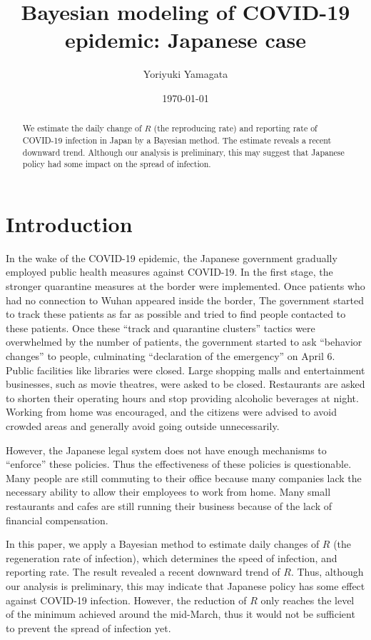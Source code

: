 \documentclass{amsart}
\title{Bayesian modeling of COVID-19 epidemic: Japanese case}
\author{Yoriyuki Yamagata}
\date{\today}
\begin{document}
\maketitle

\begin{abstract}
 We estimate the daily change of $R$ (the reproducing rate) and reporting rate of COVID-19 infection in Japan by a Bayesian method.
 The estimate reveals a recent downward trend.
 Although our analysis is preliminary, this may suggest that Japanese policy had some impact on the spread of infection.
\end{abstract}

\section{Introduction}

In the wake of the COVID-19 epidemic, the Japanese government gradually employed public health measures against COVID-19.
In the first stage, the stronger quarantine measures at the border were implemented.
Once patients who had no connection to Wuhan appeared inside the border, The government started to track these patients as far as possible and tried to find people contacted to these patients.
Once these ``track and quarantine clusters'' tactics were overwhelmed by the number of patients, the government started to ask ``behavior changes'' to people, culminating ``declaration of the emergency'' on April 6.
Public facilities like libraries were closed.
Large shopping malls and entertainment businesses, such as movie theatres, were asked to be closed.
Restaurants are asked to shorten their operating hours and stop providing alcoholic beverages at night.
Working from home was encouraged, and the citizens were advised to avoid crowded areas and generally avoid going outside unnecessarily.

However, the Japanese legal system does not have enough mechanisms to ``enforce'' these policies.
Thus the effectiveness of these policies is questionable.
Many people are still commuting to their office because many companies lack the necessary ability to allow their employees to work from home.
Many small restaurants and cafes are still running their business because of the lack of financial compensation.

In this paper, we apply a Bayesian method to estimate daily changes of $R$ (the regeneration rate of infection), which determines the speed of infection, and reporting rate.
The result revealed a recent downward trend of $R$.
Thus, although our analysis is preliminary, this may indicate that Japanese policy has some effect against COVID-19 infection.
However, the reduction of $R$ only reaches the level of the minimum achieved around the mid-March, thus it would not be sufficient to prevent the spread of infection yet.
\end{document}
